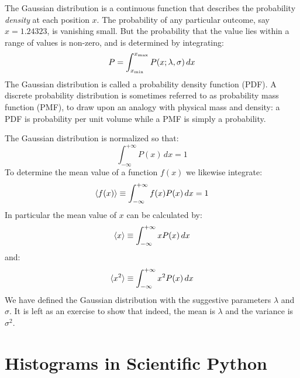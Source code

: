 \documentclass[12pt,oneside]{book}
\begin{document}
The Gaussian distribution is a continuous function that describes the
probability {\em density} at each position $x$.  The probability of
any particular outcome, say $x=1.24323$, is vanishing small.  But the
probability that the value lies within a range of values is non-zero,
and is determined by integrating:
\begin{displaymath}
P = \int_{x_{\rm min}}^{x_{\rm max}} P(x;\lambda,\sigma) \, dx
\end{displaymath}
The Gaussian distribution is called a probability density function
(PDF).  A discrete probability distribution is sometimes referred to
as probability mass function (PMF), to draw upon an analogy with
physical mass and density: a PDF is probability per unit volume while
a PMF is simply a probability.

The Gaussian distribution is normalized so that:
\begin{displaymath}
\int_{-\infty}^{+\infty} P(x) \, dx = 1
\end{displaymath}
To determine the mean value of a function $f(x)$ we likewise integrate:
\begin{displaymath}
\braket{f(x)} \equiv \int_{-\infty}^{+\infty} f(x) P(x) \, dx = 1
\end{displaymath}
In particular the mean value of $x$ can be calculated by:
\begin{displaymath}
\braket{x} \equiv \int_{-\infty}^{+\infty} x P(x) \, dx 
\end{displaymath}
and:
\begin{displaymath}
\braket{x^2}  \equiv \int_{-\infty}^{+\infty} x^2 P(x) \, dx 
\end{displaymath}
We have defined the Gaussian distribution with the suggestive
parameters $\lambda$ and $\sigma$.  It is left as an exercise to show
that indeed, the mean is $\lambda$ and the variance is $\sigma^2$.


\section{Histograms in Scientific Python}
\end{document}
